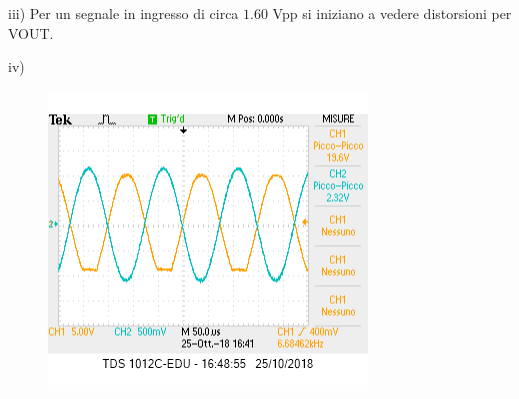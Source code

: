 \documentclass[10pt,a4paper]{article}
\begin{document}
iii) Per un segnale in ingresso di circa $1.60$ \si{\volt}pp si iniziano a vedere distorsioni per VOUT.

iv)\begin{figure}[h]
	\centering
	\includegraphics[scale=0.5]{clipping.png}
\end{figure}
\end{document}
